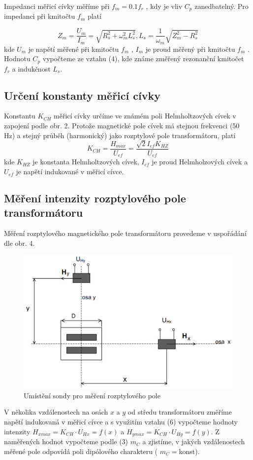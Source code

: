 \documentclass{article}
\begin{document}
Impedanci měřicí cívky měříme při  $f_m = 0.1 f_r$ , kdy je vliv  $C_p$  zanedbatelný. Pro impedanci při kmitočtu  $f_m$  platí

\begin{equation}
	Z_m = \frac{U_m}{I_m} = \sqrt{R_s^2+\omega_m^2L_s^2}, L_s = \frac{1}{\omega_m}\sqrt{Z_m^2-R_s^2}
\end{equation}
kde $U_m$ je napětí měřené při kmitočtu  $f_m$ , $I_m$  je proud měřený při kmitočtu  $f_m$ . Hodnotu $C_p$ vypočteme ze vztahu (4), kde známe změřený rezonanční kmitočet $f_r$ a indukčnost $L_s$. 

\subsection{Určení konstanty měřicí cívky}
Konstantu  $K_{CH}$  měřicí cívky určíme ve známém poli Helmholtzových cívek v zapojení podle obr. 2. Protože magnetické pole cívek má stejnou frekvenci (50 \si{\hertz}) a stejný průběh (harmonický) jako rozptylové pole transformátoru, platí
\begin{equation}
	K_{CH} = \frac{H_{max}}{U_{ef}} = \frac{\sqrt{2}I_{ef}K_{HZ}}{U_{ef}}
\end{equation}
kde  $K_{HZ}$  je konstanta Helmholtzových cívek, 
$I_{ef}$  je proud Helmholzových cívek a $U_{ef}$ je napětí indukované v měřicí cívce.

\subsection{Měření intenzity rozptylového pole transformátoru }
Měření rozptylového magnetického pole transformátoru provedeme v uspořádání dle obr. 4.
\begin{figure}[H]
	\centering
	\includegraphics[width=0.6\linewidth]{screenshot003}
	\caption{Umístění sondy pro měření rozptylového pole}
	\label{fig:screenshot003}
\end{figure}
V několika vzdálenostech na osách $x$ a $y$ od středu transformátoru změříme napětí indukovaná v měřicí cívce a s využitím vztahu (6) vypočteme hodnoty  intenzity  $H_{xmax} =  K_{CH}\cdot U_{Hx} = f(x)$  a  $H_{ymax} = K_{CH}\cdot U_{Hy} = f(y)$.  Z naměřených hodnot vypočteme podle (3) $m_C$ a zjistíme, v jakých vzdálenostech měřené pole odpovídá poli dipólového charakteru ( $m_C = $konst).
\end{document}
